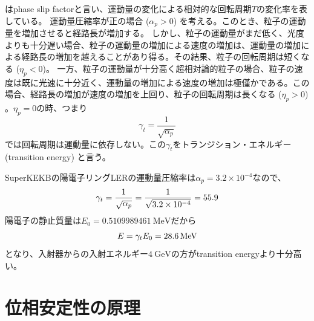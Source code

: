 \documentclass[10pt,a4paper]{jlreq}
\begin{document}
%
はphase slip factorと言い、運動量の変化による相対的な回転周期$T$の変化率を表している。
%
運動量圧縮率が正の場合 ($\alpha_p>0$) を考える。このとき、粒子の運動量を増加させると経路長が増加する。 しかし、粒子の運動量がまだ低く、光度よりも十分遅い場合、粒子の運動量の増加による速度の増加は、運動量の増加による経路長の増加を越えることがあり得る。その結果、粒子の回転周期は短くなる ($\eta_p < 0$)。
一方、粒子の運動量が十分高く超相対論的粒子の場合、粒子の速度は既に光速に十分近く、運動量の増加による速度の増加は極僅かである。この場合、経路長の増加が速度の増加を上回り、粒子の回転周期は長くなる ($\eta_p>0$) 。$\eta_p = 0$の時、つまり
%
\begin{equation}
  \gamma_t = \frac{1}{\sqrt{\alpha_p}}
\end{equation}
%
では回転周期は運動量に依存しない。この$\gamma_t$をトランジション・エネルギー (transition energy) と言う。

\vspace{\baselineskip}

\begin{tcolorbox}[title=\textgt{SuperKEKB LERのtransition energy}]
  SuperKEKBの陽電子リングLERの運動量圧縮率は$\alpha_p = 3.2 \times 10^{-4}$なので、
  \begin{equation}
    \gamma_t = \frac{1}{\sqrt{\alpha_p}}= \frac{1}{\sqrt{3.2 \times 10^{-4}}} = 55.9 \notag
  \end{equation}
  陽電子の静止質量は$E_0 = \SI{0.5109989461}{\mega\electronvolt}$だから
  \begin{equation}
    E = \gamma_t E_0 = \SI{28.6}{\mega\electronvolt} \notag
  \end{equation}
  となり、入射器からの入射エネルギー$\SI{4}{\giga\electronvolt}$の方がtransition energyより十分高い。
\end{tcolorbox}

\section{位相安定性の原理}
\end{document}
